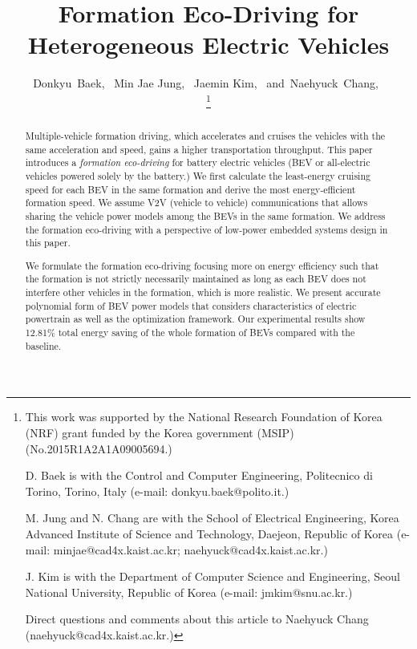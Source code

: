 \documentclass{IEEEtran}
\begin{document}
\title{Formation Eco-Driving for Heterogeneous Electric Vehicles}

\author{
Donkyu~Baek,~  
Min Jae Jung,~
Jaemin Kim,~
and~Naehyuck~Chang,~

\thanks{
This work was supported by the National Research Foundation of Korea (NRF) grant funded by the Korea government (MSIP) (No.2015R1A2A1A09005694.) 

D. Baek is with the Control and Computer Engineering, Politecnico di Torino, Torino, Italy (e-mail: donkyu.baek@polito.it.)

M. Jung and N. Chang are with the School of Electrical Engineering, Korea Advanced Institute of Science and Technology, Daejeon, Republic of Korea (e-mail: minjae@cad4x.kaist.ac.kr; naehyuck@cad4x.kaist.ac.kr.)

J. Kim is with the Department of Computer Science and Engineering, Seoul National University, Republic of Korea (e-mail: jmkim@snu.ac.kr.)

Direct questions and comments about this article to Naehyuck Chang (naehyuck@cad4x.kaist.ac.kr.)}
}

\maketitle

\begin{abstract}
Multiple-vehicle formation driving, which accelerates and cruises the vehicles with the same acceleration and speed, gains a higher transportation throughput. This paper introduces a \textit{formation eco-driving} for battery electric vehicles (BEV or all-electric vehicles powered solely by the battery.) We first calculate the least-energy cruising speed for each BEV in the same formation and derive the most energy-efficient formation speed. We assume V2V (vehicle to vehicle) communications that allows sharing the vehicle power models among the BEVs in the same formation. We address the formation eco-driving with a perspective of low-power embedded systems design in this paper.

We formulate the formation eco-driving focusing more on energy efficiency such that the formation is not strictly necessarily maintained as long as each BEV does not interfere other vehicles in the formation, which is more realistic. We present accurate polynomial form of BEV power models that considers characteristics of electric powertrain as well as the optimization framework. Our experimental results show 12.81\% total energy saving of the whole formation of BEVs compared with the baseline. 
\end{abstract}
\end{document}
